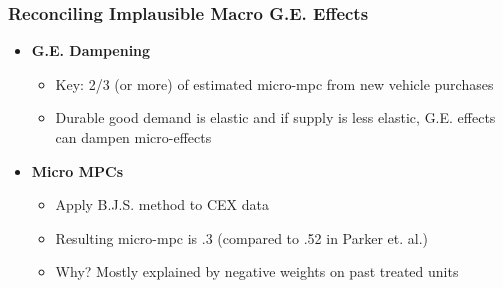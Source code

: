 \documentclass[english,xcolor=svgnames]{beamer}
\begin{document}
\begin{frame}
\frametitle{Reconciling Implausible Macro G.E. Effects}

\begin{itemize}
	\item \textbf{G.E. Dampening}
		\begin{itemize}
		\item Key: 2/3 (or more) of estimated micro-mpc from new vehicle purchases
		\item Durable good demand is elastic and if supply is less elastic, G.E. effects can dampen micro-effects
		\end{itemize}
		
\item \textbf{Micro MPCs}
	\begin{itemize}
		\item Apply B.J.S. method to CEX data
		\item Resulting micro-mpc is .3 (compared to .52 in Parker et. al.)
		\item Why? Mostly explained by negative weights on past treated units
	\end{itemize}
\end{itemize}

\end{frame}
\end{document}
